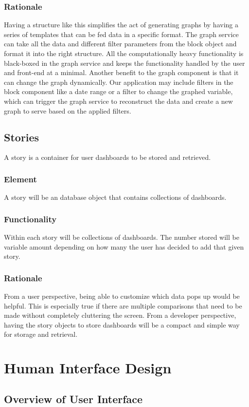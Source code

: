 \documentclass[journal,10pt,onecolumn,compsoc]{IEEEtran}
\begin{document}
    \subsubsection{Rationale}
    Having a structure like this simplifies the act of generating graphs by having a series of templates that can be fed data in a specific format. The graph service can take all the data and different filter parameters from the block object and format it into the right structure. All the computationally heavy functionality is black-boxed in the graph service and keeps the functionality handled by the user and front-end at a minimal. Another benefit to the graph component is that it can change the graph dynamically. Our application may include filters in the block component like a date range or a filter to change the graphed variable, which can trigger the graph service to reconstruct the data and create a new graph to serve based on the applied filters.
	\subsection{Stories}
	A story is a container for user dashboards to be stored and retrieved.
	\subsubsection{Element}
	A story will be an database object that contains collections of dashboards.
	\subsubsection{Functionality}
    Within each story will be collections of dashboards. The number stored will be variable amount depending on how many the user has decided to add that given story.
	\subsubsection{Rationale}
	From a user perspective, being able to customize which data pops up would be helpful. This is especially true if there are multiple comparisons that need to be made without completely cluttering the screen. From a developer perspective, having the story objects to store dashboards will be a compact and simple way for storage and retrieval.
	\section{Human Interface Design}
    \subsection{Overview of User Interface}
    \iffalse
    Describe the functionality of the system from the user’s perspective. Explain how the
    user will be able to use your system to complete all the expected features and the
    feedback information that will be displayed for the user.
    \fi
\end{document}
